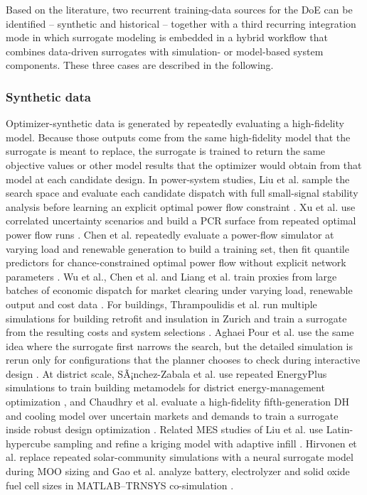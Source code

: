 Based on the literature, two recurrent training-data sources for the
DoE can be identified -- synthetic and historical -- together with a
third recurring integration mode in which surrogate modeling is embedded
in a hybrid workflow that combines data-driven surrogates with
simulation- or model-based system components. These three cases are
described in the following.

\subsubsection{Synthetic data}

Optimizer-synthetic data is generated by repeatedly evaluating a
high-fidelity model. Because those outputs come from the same
high-fidelity model that the surrogate is meant to replace, the
surrogate is trained to return the same objective values or other model
results that the optimizer would obtain from that model at each
candidate design. In power-system studies, Liu et al. sample the search
space and evaluate each candidate dispatch with full small-signal
stability analysis before learning an explicit optimal power flow
constraint \cite{Liu20223726}. Xu et al. use correlated uncertainty
scenarios and build a PCR surface from repeated optimal power flow runs
\cite{Xu20212696}. Chen et al. repeatedly evaluate a power-flow simulator at
varying load and renewable generation to build a training set, then fit
quantile predictors for chance-constrained optimal power flow without
explicit network parameters \cite{Chen2023657}. Wu et al., Chen et al. and
Liang et al. train proxies from large batches of economic dispatch for
market clearing under varying load, renewable output and cost data
\cite{Wu2022231,Chen2022,Liang20246508}. For buildings, Thrampoulidis et
al. run multiple simulations for building retrofit and insulation in
Zurich and train a surrogate from the resulting costs and system
selections \cite{Thrampoulidis2021}. Aghaei Pour et al. use the same idea
where the surrogate first narrows the search, but the detailed
simulation is rerun only for configurations that the planner chooses to
check during interactive design \cite{Aghaei Pour2022303}. At district
scale, SÃ¡nchez-Zabala et al. use repeated EnergyPlus simulations to
train building metamodels for district energy-management optimization
\cite{Sánchez-Zabala2024}, and Chaudhry et al.
evaluate a high-fidelity fifth-generation DH and cooling model over
uncertain markets and demands to train a surrogate inside robust design
optimization \cite{Chaudhry2024}. Related MES studies of Liu et al. use
Latin-hypercube sampling and refine a kriging model with adaptive infill
\cite{Liu201914569}. Hirvonen et al. replace repeated solar-community
simulations with a neural surrogate model during MOO sizing
\cite{Hirvonen2017323} and Gao et al. analyze battery, electrolyzer and
solid oxide fuel cell sizes in MATLAB--TRNSYS co-simulation \cite{Gao2025}.

